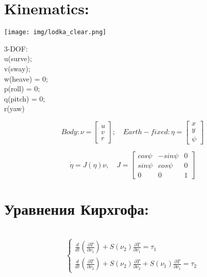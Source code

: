 \newpage

\section*{Kinematics:}

\begin{center}
\texttt{[image: img/lodka\_clear.png]}\\
\end{center} 

3-DOF: \\

u(surve); \\

v(sway); \\

w(heave) = 0; \\

p(roll) = 0; \\

q(pitch) = 0; \\

r(yaw) \\



\begin{center}
\begin{equation*}

Body: \nu = \begin{bmatrix}
u \\
v \\
r
\end{bmatrix};\quad Earth-fixed: \eta = \begin{bmatrix}
 x \\
 y \\
 \psi
 \end{bmatrix} 
\end{equation*} 
\end{center}
\begin{equation*}
\Dot{\eta} = J(\eta)\nu, \quad J = \begin{bmatrix}
cos\psi & -sin\psi & 0 \\
sin\psi & cos\psi & 0 \\
0 & 0 & 1
 \end{bmatrix} 
\end{equation*}


\newpage
\section*{Уравнения Кирхгофа:}\\
\large
\begin{equation*}
 \begin{cases}
   \frac{d}{dt}(\frac{\partial T}{\partial \nu_1}) + S(\nu_2)\frac{\partial T}{\partial \nu_1} = \tau_1\\
   \frac{d}{dt}(\frac{\partial T}{\partial \nu_2}) + S(\nu_2)\frac{\partial T}{\partial \nu_2} + S(\nu_1)\frac{\partial T}{\partial \nu_1} = \tau_2
 \end{cases}
 \end{equation*}
 
